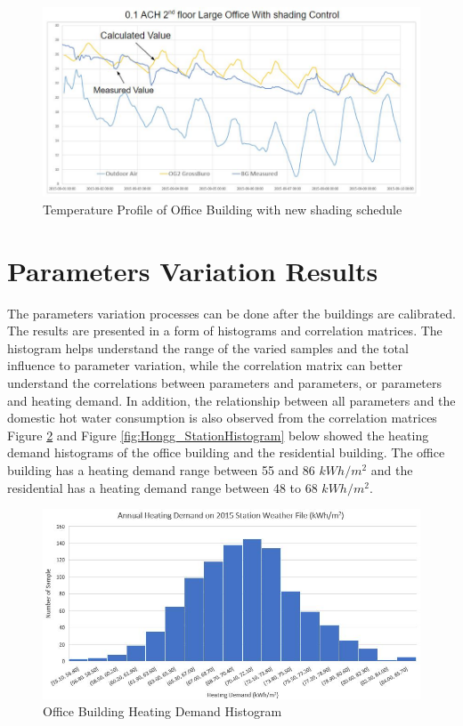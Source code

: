 \documentclass[a4paper, oneside]{discothesis}
\begin{document}
		
            \begin{figure}[H]
			\centering
			\includegraphics[scale=0.5]{Sumatra_Calibration_NewShading.JPG}
			\caption{Temperature Profile of Office Building with new shading schedule}
			\label{fig:Sumatra_Calibration_NewShading}
			\end{figure}
			
	\section{Parameters Variation Results}

		The parameters variation processes can be done after the buildings are calibrated. The results are presented in a form of histograms and correlation matrices. The histogram helps understand the range of the varied samples and the total influence to parameter variation, while the correlation matrix can better understand the correlations between parameters and parameters, or parameters and heating demand. In addition, the relationship between all parameters and the domestic hot water consumption is also observed from the correlation matrices\\
		
		Figure \ref{fig:Sumatra_StationHistogram} and Figure \ref{fig:Hongg_StationHistogram} below showed the heating demand histograms of the office building and the residential building. The office building has a heating demand range between 55 and 86 $kWh/m^2$ and the residential has a heating demand range between 48 to 68 $kWh/m^2$.\\

	    \begin{figure}[H]
		\centering
		\includegraphics[scale=0.65]{Sumatra_2015Distribution.jpg}
		\caption{Office Building Heating Demand Histogram}
		\label{fig:Sumatra_StationHistogram}
		\end{figure}	
\end{document}
